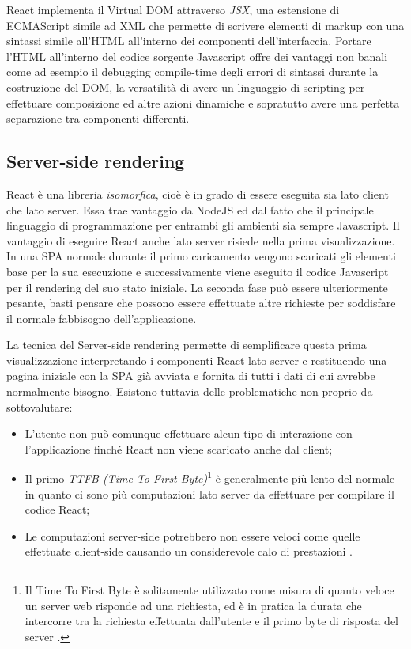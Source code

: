 \noindent
React implementa il Virtual DOM attraverso \textit{JSX}, una estensione di ECMAScript simile ad XML che permette di scrivere elementi di markup con una sintassi simile all'HTML all'interno dei componenti dell'interfaccia. Portare l'HTML all'interno del codice sorgente Javascript offre dei vantaggi non banali come ad esempio il debugging compile-time degli errori di sintassi durante la costruzione del DOM, la versatilità di avere un linguaggio di scripting per effettuare composizione ed altre azioni dinamiche e sopratutto avere una perfetta separazione tra componenti differenti.

\subsection{Server-side rendering}
React è una libreria \textit{isomorfica}, cioè è in grado di essere eseguita sia lato client che lato server. Essa trae vantaggio da NodeJS ed dal fatto che il principale linguaggio di programmazione per entrambi gli ambienti sia sempre Javascript.
Il vantaggio di eseguire React anche lato server risiede nella prima visualizzazione. In una SPA normale durante il primo caricamento vengono scaricati gli elementi base per la sua esecuzione e successivamente viene eseguito il codice Javascript per il rendering del suo stato iniziale. La seconda fase può essere ulteriormente pesante, basti pensare che possono essere effettuate altre richieste per soddisfare il normale fabbisogno dell'applicazione.

La tecnica del Server-side rendering permette di semplificare questa prima visualizzazione interpretando i componenti React lato server e restituendo una pagina iniziale con la SPA già avviata e fornita di tutti i dati di cui avrebbe normalmente bisogno. Esistono tuttavia delle problematiche non proprio da sottovalutare: 

\begin{itemize}
    \item L'utente non può comunque effettuare alcun tipo di interazione con l'applicazione finché React non viene scaricato anche dal client;
    \item Il primo \textit{TTFB (Time To First Byte)}\footnote{Il Time To First Byte è solitamente utilizzato come misura di quanto veloce un server web risponde ad una richiesta, ed è in pratica la durata che intercorre tra la richiesta effettuata dall'utente e il primo byte di risposta del server \cite{GrahamOnTTFB}.} è generalmente più lento del normale in quanto ci sono più computazioni lato server da effettuare per compilare il codice React;
    \item Le computazioni server-side potrebbero non essere veloci come quelle effettuate client-side causando un considerevole calo di prestazioni \cite{GrigoryanOnServerSideRendering}.
\end{itemize}